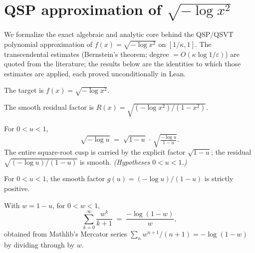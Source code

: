 
\section{QSP approximation of \texorpdfstring{$\sqrt{-\log x^2}$}{sqrt(-log x^2)}}

We formalize the exact algebraic and analytic core behind the QSP/QSVT
polynomial approximation of $f(x) = \sqrt{-\log x^2}$ on $[1/\kappa, 1]$. The
transcendental estimates (Bernstein's theorem; degree $= O(\kappa \log 1/\varepsilon)$)
are quoted from the literature; the results below are the identities to which
those estimates are applied, each proved unconditionally in Lean.

\begin{definition}
  \label{def:qsp-f}
  The target is $f(x) = \sqrt{-\log x^2}$.
\end{definition}

\begin{definition}
  \label{def:qsp-R}
  The smooth residual factor is $R(x) = \sqrt{(-\log x^2)/(1 - x^2)}$.
\end{definition}

\begin{lemma}
  \label{lem:qsp-factorization}
  For $0 < u < 1$,
  \[
    \sqrt{-\log u} \;=\; \sqrt{1 - u}\,\cdot\,\sqrt{\tfrac{-\log u}{1 - u}}.
  \]
  The entire square-root cusp is carried by the explicit factor $\sqrt{1-u}$;
  the residual $\sqrt{(-\log u)/(1-u)}$ is smooth. \emph{(Hypotheses $0<u<1$.)}
\end{lemma}

\begin{lemma}
  \label{lem:qsp-gpos}
  For $0 < u < 1$, the smooth factor $g(u) = (-\log u)/(1-u)$ is strictly positive.
\end{lemma}

\begin{lemma}
  \label{lem:qsp-hasSum}
  With $w = 1 - u$, for $0 < w < 1$,
  \[
    \sum_{k=0}^{\infty} \frac{w^k}{k+1} \;=\; \frac{-\log(1 - w)}{w},
  \]
  obtained from Mathlib's Mercator series $\sum_n w^{n+1}/(n+1) = -\log(1-w)$ by
  dividing through by $w$.
\end{lemma}

